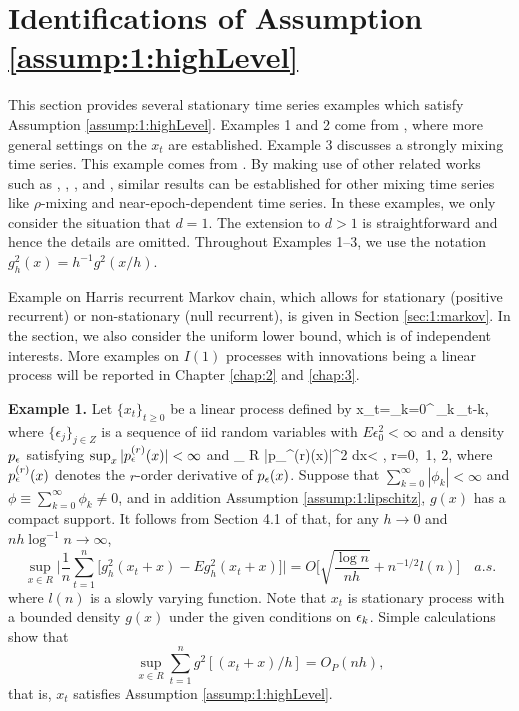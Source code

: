 \section{Identifications of Assumption \ref{assump:1:highLevel}} 
This section  provides several  stationary time series examples which satisfy Assumption \ref{assump:1:highLevel}. Examples 1 and 2  come from \cite{wuhuanghuang2010}, where more general settings on the $x_t$  are established. Example 3 discusses a strongly mixing time series. This example comes from \cite{hansen2008}. By making use of other related works such as \cite{peligrad1992}, \cite{nzedoukhan2004},  \cite{masry1996}, \cite{bosq1998} and \cite{andrews1995}, similar results can be established for other mixing time series like $\rho$-mixing  and near-epoch-dependent time series. In these examples, we only consider the situation that $d=1$. The extension to $d> 1$ is straightforward and hence  the details are omitted. Throughout Examples 1--3, we use the notation $g^2_h(x)= h^{-1}g^2(x/h)$.

Example on Harris recurrent Markov chain, which allows for stationary (positive recurrent) or non-stationary (null recurrent), is given in Section \ref{sec:1:markov}. In the section, we also consider the uniform lower bound, which is of independent interests.
More examples on $I(1)$ processes with innovations being a linear process will be reported in Chapter \ref{chap:2} and \ref{chap:3}.

\medskip
{\bf Example 1.} Let $\{x_{t}\}_{t\geq 0}$ be a linear process defined by
\bestar
x_{t}=\sum_{k=0}^{\infty }\,\phi _{k}\,\epsilon_{t-k},
\eestar
where $\{\epsilon _{j} \}_{j\in Z}$ is a sequence of iid
random variables with $E\epsilon _{0}^{2}<\infty$ and a density $p_\epsilon$ satisfying $\sup_x|p_\epsilon^{(r)}(x)|<\infty$ and
\bestar
\int_{ R} |p_\ep^{(r)}(x)|^2  dx< \infty, \quad r=0,\ 1, 2,
\eestar
where $p_\epsilon^{(r)}(x)$ denotes the $r$-order derivative of $p_\epsilon(x)$. Suppose that $\sum_{k=0}^\infty |\phi_k| < \infty$ and $\phi \equiv \sum_{k=0}^\infty \phi_k \ne 0$, and in addition Assumption \ref{assump:1:lipschitz}, $g(x)$ has a compact support. It follows from Section 4.1 of \cite{wuhuanghuang2010} that,
 for any $h \rightarrow 0$ and $nh \log^{-1}n \rightarrow \infty$,
\begin{equation}
\sup_{x \in  R} \Big | \frac{1}{n} \sum_{t =1}^{n} \big[g_h^2(x_t + x) - Eg_h^2(x_t + x)\big] \Big | = O \Big [\sqrt{\frac{\log n}{nh}} + n^{-1/2} l(n) \Big ] \quad a.s.
\end{equation}
where $l(n)$ is a slowly varying function.
Note that $x_t$ is stationary process with a bounded density $g(x)$ under the given conditions on $\epsilon_k$. Simple calculations show that
\begin{equation}
\sup_{x \in  R} \sum_{t =1}^{n} g^2[(x_t + x)/h] = O_P(nh),
\end{equation}
that is, $x_t$ satisfies Assumption \ref{assump:1:highLevel}.

